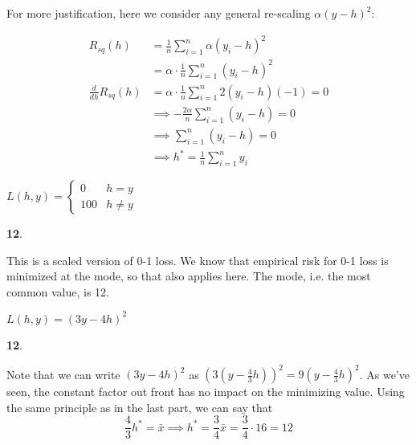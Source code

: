 \documentclass{article}
\begin{document}
\begin{probset}
\begin{prob}
\begin{subprobset}
\begin{subprob}[1.5 Points]
\begin{soln}
For more justification, here we consider any general re-scaling $\alpha (y-h)^2$:

\begin{align*}
    R_{sq}(h) &= \frac{1}{n} \sum_{i = 1}^n \alpha (y_i - h)^2 \\
              &= \alpha \cdot \frac{1}{n} \sum_{i = 1}^n (y_i - h)^2 \\
  \frac{d}{dh} R_{sq}(h) &= \alpha \cdot \frac{1}{n} \sum_{i = 1}^n 2(y_i - h)(-1) = 0\\
  &\implies -\frac{2\alpha}{n}\sum_{i = 1}^n (y_i - h) = 0 \\
  &\implies \sum_{i = 1}^n (y_i - h) = 0 \\
  &\implies h^* = \frac{1}{n} \sum_{i = 1}^n y_i
\end{align*}

\end{soln}
\end{subprob}

\vspace{.75in}

\begin{subprob}[1.5 Points]
$L(h, y) = \begin{cases} 0 & h = y \\ 100 & h \neq y \end{cases}$

\begin{soln}
\textbf{12}.

This is a scaled version of 0-1 loss. We know that empirical risk for 0-1 loss is minimized at the mode, so that also applies here. The mode, i.e. the most common value, is 12.

\end{soln}
\end{subprob}

\vspace{.75in}

\begin{subprob}[2.5 Points]
$L(h, y) = (3y - 4h)^2$

\begin{soln}
\textbf{12}.

Note that we can write $(3y - 4h)^2$ as $\left( 3 \left( y - \frac{4}{3}h \right) \right)^2 = 9 \left( y - \frac{4}{3}h \right)^2$. As we've seen, the constant factor out front has no impact on the minimizing value. Using the same principle as in the last part, we can say that $$\frac{4}{3} h^* = \bar{x} \implies h^* = \frac{3}{4} \bar{x} = \frac{3}{4} \cdot 16 = 12$$


\end{soln}
\end{subprob}
\end{subprobset}
\end{prob}
\end{probset}
\end{document}
